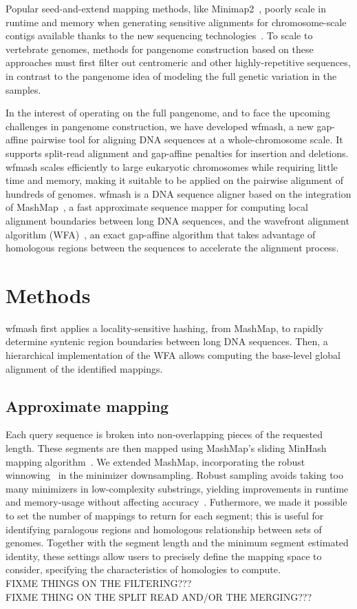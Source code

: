 \documentclass{bioinfo}
\begin{document}
Popular seed-and-extend mapping methods, like Minimap2~\citep{29750242}, poorly scale in runtime and memory when generating
sensitive alignments for chromosome-scale contigs available thanks to the new sequencing technologies~\citep{33288905}.
To scale to vertebrate genomes, methods for pangenome construction based on these approaches must first filter out centromeric
and other highly-repetitive sequences, in contrast to the pangenome idea of modeling the full genetic variation in the samples.

In the interest of operating on the full pangenome, and to face the upcoming challenges in pangenome construction,
we have developed wfmash, a new gap-affine pairwise tool for aligning DNA sequences at a whole-chromosome scale.
It supports split-read alignment and gap-affine penalties for insertion and deletions.
wfmash scales efficiently to large eukaryotic chromosomes while requiring little time and memory, making it suitable to
be applied on the pairwise alignment of hundreds of genomes.
wfmash is a DNA sequence aligner based on the integration of MashMap~\citep{30423094}, a fast approximate sequence mapper
for computing local alignment boundaries between long DNA sequences, and the wavefront alignment algorithm (WFA)~\citep{32915952},
an exact gap-affine algorithm that takes advantage of homologous regions between the sequences to accelerate the alignment process.


\section{Methods}

wfmash first applies a locality-sensitive hashing, from MashMap, to rapidly determine syntenic region
boundaries between long DNA sequences. Then, a hierarchical implementation of the WFA allows computing the
base-level global alignment of the identified mappings.

\subsection{Approximate mapping}
Each query sequence is broken into non-overlapping pieces of the requested length.
These segments are then mapped using MashMap's sliding MinHash mapping algorithm~\citep{30423094}.
We extended MashMap, incorporating the robust winnowing~\citep{Schleimer S. et al. (2003)} in the minimizer downsampling.
Robust sampling avoids taking too many minimizers in low-complexity substrings, yielding improvements in runtime and memory-usage without affecting accuracy~\citep{32657365}.
Futhermore, we made it possible to set the number of mappings to return for each segment; this is useful for identifying
paralogous regions and homologous relationship between sets of genomes.
Together with the segment length and the minimum segment estimated identity, these settings allow users to precisely
define the mapping space to consider, specifying the characteristics of homologies to compute.
\\
FIXME THINGS ON THE FILTERING???
\\
FIXME THING ON THE SPLIT READ AND/OR THE MERGING???
\\
\end{document}
